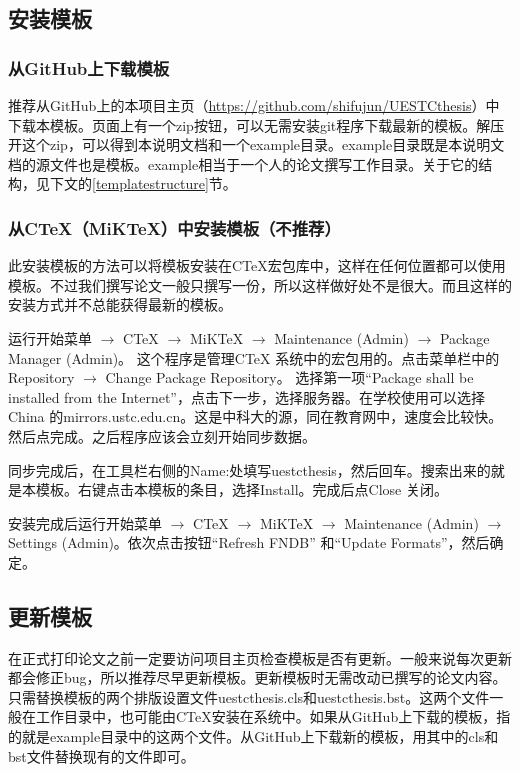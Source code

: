 \subsection{安装模板}
\subsubsection{从GitHub上下载模板}
推荐从GitHub上的本项目主页（\url{https://github.com/shifujun/UESTCthesis}）中下载本模板。页面上有一个zip按钮，可以无需安装git程序下载最新的模板。解压开这个zip，可以得到本说明文档和一个example目录。example目录既是本说明文档的源文件也是模板。example相当于一个人的论文撰写工作目录。关于它的结构，见下文的\ref{templatestructure}节。
\subsubsection{从CTeX（MiKTeX）中安装模板（不推荐）}
此安装模板的方法可以将模板安装在CTeX宏包库中，这样在任何位置都可以使用模板。不过我们撰写论文一般只撰写一份，所以这样做好处不是很大。而且这样的安装方式并不总能获得最新的模板。

运行开始菜单 $\longrightarrow$ CTeX $\longrightarrow$ MiKTeX $\longrightarrow$ Maintenance (Admin) $\longrightarrow$ Package Manager (Admin)。 这个程序是管理CTeX 系统中的宏包用的。点击菜单栏中的Repository $\longrightarrow$ Change Package Repository。 选择第一项“Package shall be installed from the Internet”，点击下一步，选择服务器。在学校使用可以选择China 的mirrors.ustc.edu.cn。这是中科大的源，同在教育网中，速度会比较快。然后点完成。之后程序应该会立刻开始同步数据。

同步完成后，在工具栏右侧的Name:处填写uestcthesis，然后回车。搜索出来的就是本模板。右键点击本模板的条目，选择Install。完成后点Close 关闭。

安装完成后运行开始菜单 $\longrightarrow$ CTeX $\longrightarrow$ MiKTeX $\longrightarrow$ Maintenance (Admin) $\longrightarrow$ Settings (Admin)。依次点击按钮“Refresh FNDB” 和“Update Formats”，然后确定。
\subsection{更新模板}
在正式打印论文之前一定要访问项目主页检查模板是否有更新。一般来说每次更新都会修正bug，所以推荐尽早更新模板。更新模板时无需改动已撰写的论文内容。只需替换模板的两个排版设置文件uestcthesis.cls和uestcthesis.bst。这两个文件一般在工作目录中，也可能由CTeX安装在系统中。如果从GitHub上下载的模板，指的就是example目录中的这两个文件。从GitHub上下载新的模板，用其中的cls和bst文件替换现有的文件即可。

